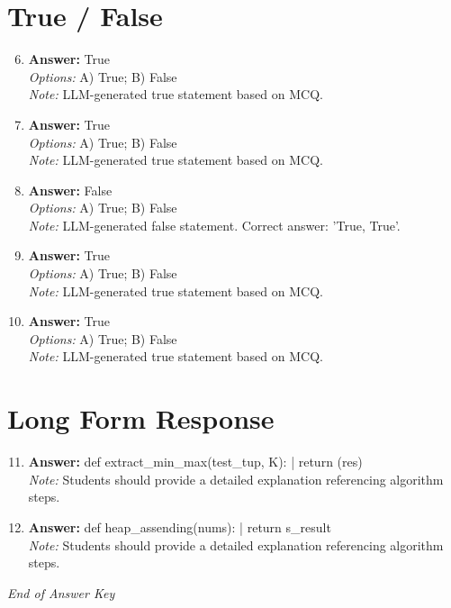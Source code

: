 \documentclass[12pt]{article}
\begin{document}
\section*{True / False}
\begin{enumerate}[label=\arabic*.]
\setcounter{enumi}{5}
\item \textbf{Answer:} True
\\ \textit{Options:} A) True; B) False
\\ \textit{Note:} LLM-generated true statement based on MCQ.
\item \textbf{Answer:} True
\\ \textit{Options:} A) True; B) False
\\ \textit{Note:} LLM-generated true statement based on MCQ.
\item \textbf{Answer:} False
\\ \textit{Options:} A) True; B) False
\\ \textit{Note:} LLM-generated false statement. Correct answer: 'True, True'.
\item \textbf{Answer:} True
\\ \textit{Options:} A) True; B) False
\\ \textit{Note:} LLM-generated true statement based on MCQ.
\item \textbf{Answer:} True
\\ \textit{Options:} A) True; B) False
\\ \textit{Note:} LLM-generated true statement based on MCQ.
\end{enumerate}

\section*{Long Form Response}
\begin{enumerate}[label=\arabic*.]
\setcounter{enumi}{10}
\item \textbf{Answer:} def extract\_min\_max(test\_tup, K): | return (res)
\\ \textit{Note:} Students should provide a detailed explanation referencing algorithm steps.
\item \textbf{Answer:} def heap\_assending(nums): | return s\_result
\\ \textit{Note:} Students should provide a detailed explanation referencing algorithm steps.
\end{enumerate}

\vfill
\noindent\textit{End of Answer Key}
\end{document}
